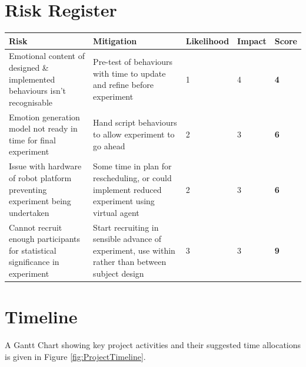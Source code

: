 \documentclass[11pt]{article}
\begin{document}
\section{Risk Register}
\begin{center}
	\begin{tabular}{|m{6cm}|m{5cm}|m{1.8cm}|m{1cm}|m{1cm}|}
		\hline
		Risk & Mitigation & Likelihood & Impact & \textbf{Score} \\
		\hline 
		Emotional content of designed \& implemented behaviours isn’t recognisable & Pre-test of behaviours with time to update and refine before experiment & 1 & 4 & \textbf{4} \\ 
		\hline
		Emotion generation model not ready in time for final experiment & Hand script behaviours to allow experiment to go ahead & 2 & 3 & \textbf{6} \\ 
		\hline
		Issue with hardware of robot platform preventing experiment being undertaken & Some time in plan for rescheduling, or could implement reduced experiment using virtual agent & 2 & 3 & \textbf{6} \\
		\hline 
		Cannot recruit enough participants for statistical significance in experiment & Start recruiting in sensible advance of experiment, use within rather than between subject design & 3 & 3 & \textbf{9} \\
		\hline
	\end{tabular} 
\end{center}

\section{Timeline}
A Gantt Chart showing key project activities and their suggested time allocations is given in Figure \ref{fig:ProjectTimeline}. 
\end{document}
